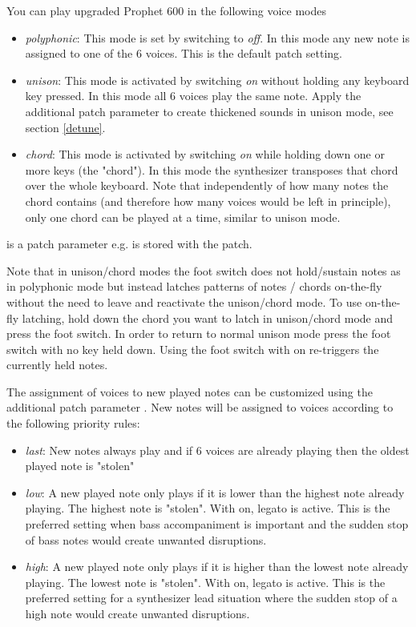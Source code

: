 You can play upgraded Prophet 600 in the following voice modes
\begin{itemize}
  \setlength\itemsep{0cm}
  \item \textit{polyphonic}: This mode is set by switching \unison to \textit{off}. In this mode any new note is assigned to one of the 6 voices. This is the default patch setting.
  \item \textit{unison}: This mode is activated by switching \unison \textit{on} without holding any keyboard key pressed. In this mode all 6 voices play the same note. Apply the additional patch parameter \detune to create thickened sounds in unison mode, see section \ref{detune}.
  \item \textit{chord}: This mode is activated by switching \unison \textit{on} while holding down one or more keys (the "chord"). In this mode the synthesizer transposes that chord over the whole keyboard. Note that independently of how many notes the chord contains (and therefore how many voices would be left in principle), only one chord can be played at a time, similar to unison mode.
\end{itemize} 

\unison is a patch parameter e.g. is stored with the patch.

Note that in unison/chord modes the foot switch does not hold/sustain notes as in polyphonic mode but instead latches patterns of notes / chords on-the-fly without the need to leave and reactivate the unison/chord mode. To use on-the-fly latching, hold down the chord you want to latch in unison/chord mode and press the foot switch. In order to return to normal unison mode press the foot switch with no key held down. Using the foot switch with \unison on re-triggers the currently held notes. 

The assignment of voices to new played notes can be customized using the additional patch parameter \prio. New notes will be assigned to voices according to the following priority rules:

\begin{itemize}
  \setlength\itemsep{0cm}
  \item \textit{last}: New notes always play and if 6 voices are already playing then the oldest played note is "stolen"
  \item \textit{low}: A new played note only plays if it is lower than the highest note already playing. The highest note is "stolen". With \unison on, legato is active. This is the preferred setting when bass accompaniment is important and the sudden stop of bass notes would create unwanted disruptions. 
  \item \textit{high}: A new played note only plays if it is higher than the lowest note already playing. The lowest note is "stolen". With \unison on, legato is active. This is the preferred setting for a synthesizer lead situation where the sudden stop of a high note would create unwanted disruptions. 
\end{itemize}

